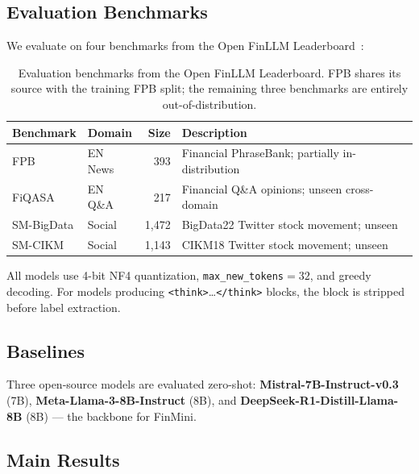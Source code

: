 \documentclass[11pt,letterpaper]{article}
\begin{document}
\subsection{Evaluation Benchmarks}

We evaluate on four benchmarks from the Open FinLLM
Leaderboard~\cite{huang2024openfinllms}:

\begin{table}[ht]
\centering
\small
\begin{tabular}{@{}llrp{5cm}@{}}
\toprule
\textbf{Benchmark} & \textbf{Domain} & \textbf{Size} & \textbf{Description} \\
\midrule
FPB   & EN News    & 393   & Financial PhraseBank; partially in-distribution \\
FiQASA & EN Q\&A   & 217   & Financial Q\&A opinions; unseen cross-domain \\
SM-BigData & Social & 1,472 & BigData22 Twitter stock movement; unseen \\
SM-CIKM    & Social & 1,143 & CIKM18 Twitter stock movement; unseen \\
\bottomrule
\end{tabular}
\caption{Evaluation benchmarks from the Open FinLLM Leaderboard.
  FPB shares its source with the training FPB split;
  the remaining three benchmarks are entirely out-of-distribution.}
\label{tab:benchmarks}
\end{table}

All models use 4-bit NF4 quantization, \texttt{max\_new\_tokens}$=32$,
and greedy decoding.
For models producing \texttt{<think>}\ldots\texttt{</think>} blocks,
the block is stripped before label extraction.

\subsection{Baselines}

Three open-source models are evaluated zero-shot:
\textbf{Mistral-7B-Instruct-v0.3} (7B),
\textbf{Meta-Llama-3-8B-Instruct} (8B), and
\textbf{DeepSeek-R1-Distill-Llama-8B} (8B) --- the backbone for FinMini.

\subsection{Main Results}
\end{document}
